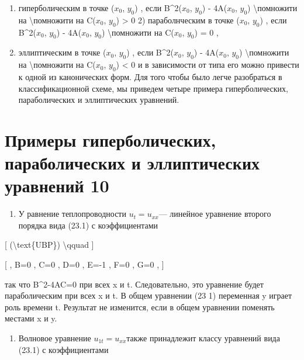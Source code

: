 \documentclass[
]{article}
\providecommand{\tightlist}{%
  \setlength{\itemsep}{0pt}\setlength{\parskip}{0pt}}
\begin{document}
{{\begin{enumerate}
\def\labelenumi{\arabic{enumi})}
\item
  гиперболическим в точке (\(x_0\), \(y_0\)) , если B\^{}2(\(x_0\),
  \(y_0\)) - 4A(\(x_0\), \(y_0\)) \textbackslash помножити на
  \textbackslash помножити на C(\(x_0\), \(y_0\)) \textgreater{} 0 2)
  параболнческим в точке (\(x_0\), \(y_0\)) , если B\^{}2(\(x_0\),
  \(y_0\)) - 4A(\(x_0\), \(y_0\)) \textbackslash помножити на C(\(x_0\),
  \(y_0\)) = 0 ,
\item
  эллиптическим в точке (\(x_0\), \(y_0\)) , если B\^{}2(\(x_0\),
  \(y_0\)) - 4A(\(x_0\), \(y_0\)) \textbackslash помножити на
  \textbackslash помножити на C(\(x_0\), \(y_0\)) \textless{} 0 и в
  зависимости от типа его можно привести к одной из канонических форм.
  Для того чтобы было легче разобраться в классификационной схеме, мы
  приведем четыре примера гиперболических, параболических и
  эллиптических уравнений.
\end{enumerate}

\section{Примеры гиперболических, параболических и эллиптических
уравнений
10}\label{ux43fux440ux438ux43cux435ux440ux44b-ux433ux438ux43fux435ux440ux431ux43eux43bux438ux447ux435ux441ux43aux438ux445-ux43fux430ux440ux430ux431ux43eux43bux438ux447ux435ux441ux43aux438ux445-ux438-ux44dux43bux43bux438ux43fux442ux438ux447ux435ux441ux43aux438ux445-ux443ux440ux430ux432ux43dux435ux43dux438ux439-10}

\begin{enumerate}
\def\labelenumi{\arabic{enumi}.}
\tightlist
\item
  У равнение теплопроводности \(u_t = u_{xx}\)--- линейное уравнение
  второго порядка вида (23.1) с коэффициентами
\end{enumerate}

{[} (\textbackslash text\{UBP\}) \textbackslash qquad {]}

{[} , B=0 , C=0 , D=0 , E=-1 , F=0 , G=0 , {]}

так что B\^{}2-4AC=0 при всех x и t. Следовательно, это уравнение будет
параболическим при всех x и t. В общем уравнении (23 1) переменная y
играет роль времени t. Результат не изменится, если в общем уравнении
поменять местами x и y.

\begin{enumerate}
\def\labelenumi{\arabic{enumi}.}
\setcounter{enumi}{1}
\tightlist
\item
  Волновое уравнение \(u_{1t} = u_{xx}\)также принадлежит классу
  уравнений вида (23.1) с коэффициентами
\end{enumerate}

}}
\end{document}
